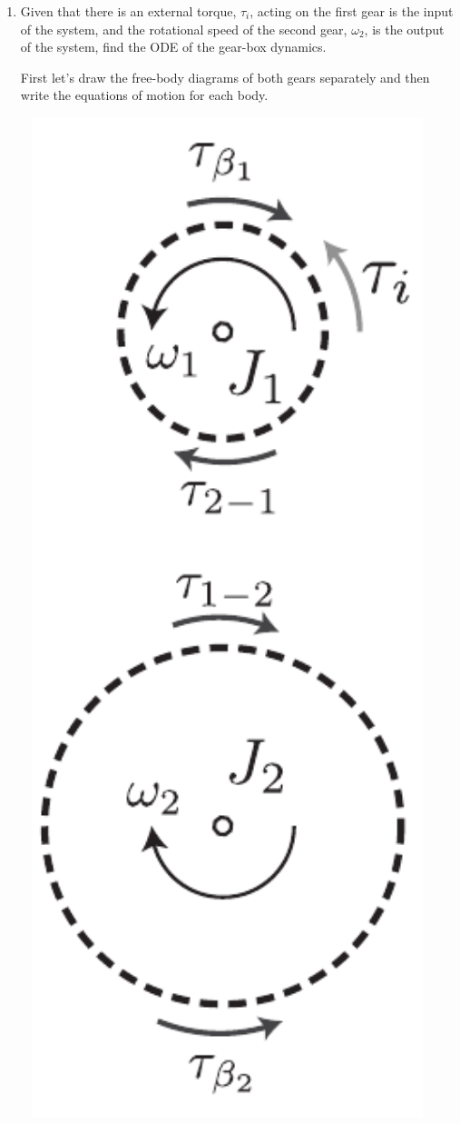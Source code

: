 \documentclass[twoside]{article}
\theoremstyle{definition}
\begin{document}
\begin{enumerate}

\item Given that there is an external torque, $\tau_i$, acting on the first gear is the input of the system, and the rotational speed of the
second gear, $\omega_2$, is the output of the system, find the ODE of the gear-box dynamics. 

First let's draw the free-body diagrams of both gears separately and then write the equations of motion for each body. 


  \begin{minipage}[h]{0.35\linewidth}
    \begin{center}
      \includegraphics[width=0.95\textwidth]{ex2_sol}

\end{center}
\end{minipage}
\end{enumerate}
\end{document}
